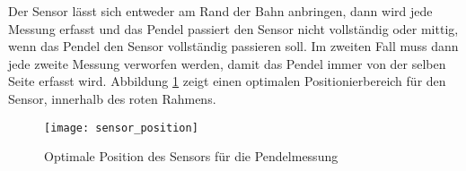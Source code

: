 Der Sensor lässt sich entweder am Rand der Bahn anbringen, dann wird jede Messung erfasst und das Pendel passiert den Sensor nicht vollständig oder mittig, wenn das Pendel den Sensor vollständig passieren soll. Im zweiten Fall muss dann jede zweite Messung verworfen werden, damit das Pendel immer von der selben Seite erfasst wird. Abbildung \ref{fig:sensor_position} zeigt einen optimalen Positionierbereich für den Sensor, innerhalb des roten Rahmens.
	\begin{figure}[H]
		\centering
		\texttt{[image: sensor\_position]}
		\caption{Optimale Position des Sensors für die Pendelmessung}
		\label{fig:sensor_position}
	\end{figure}